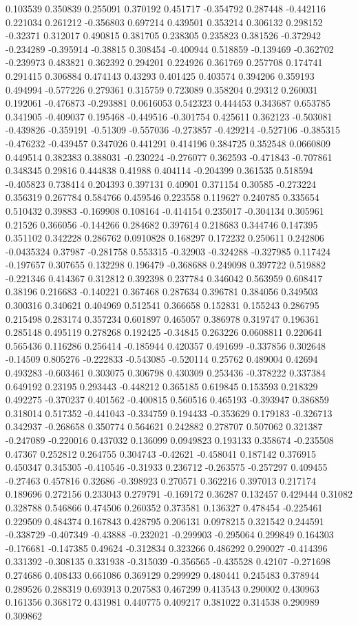 0.103539 0.350839 0.255091 0.370192 0.451717 -0.354792 0.287448 -0.442116 0.221034 0.261212 -0.356803 0.697214 0.439501 0.353214 0.306132 0.298152 -0.32371 0.312017 0.490815 0.381705 0.238305 0.235823 0.381526 -0.372942 -0.234289 -0.395914 -0.38815 0.308454 -0.400944 0.518859 -0.139469 -0.362702 -0.239973 0.483821 0.362392 0.294201 0.224926 0.361769 0.257708 0.174741 0.291415 0.306884 0.474143 0.43293 0.401425 0.403574 0.394206 0.359193 0.494994 -0.577226 0.279361 0.315759 0.723089 0.358204 0.29312 0.260031 0.192061 -0.476873 -0.293881 0.0616053 0.542323 0.444453 0.343687 0.653785 0.341905 -0.409037 0.195468 -0.449516 -0.301754 0.425611 0.362123 -0.503081 -0.439826 -0.359191 -0.51309 -0.557036 -0.273857 -0.429214 -0.527106 -0.385315 -0.476232 -0.439457 0.347026 0.441291 0.414196 0.384725 0.352548 0.0660809 0.449514 0.382383 0.388031 -0.230224 -0.276077 0.362593 -0.471843 -0.707861 0.348345 0.29816 0.444838 0.41988 0.404114 -0.204399 0.361535 0.518594 -0.405823 0.738414 0.204393 0.397131 0.40901 0.371154 0.30585 -0.273224 0.356319 0.267784 0.584766 0.459546 0.223558 0.119627 0.240785 0.335654 0.510432 0.39883 -0.169908 0.108164 -0.414154 0.235017 -0.304134 0.305961 0.21526 0.366056 -0.144266 0.284682 0.397614 0.218683 0.344746 0.147395 0.351102 0.342228 0.286762 0.0910828 0.168297 0.172232 0.250611 0.242806 -0.0435324 0.37987 -0.281758 0.553315 -0.32903 -0.324288 -0.327985 0.117424 -0.197657 0.307655 0.132298 0.196479 -0.368688 0.249098 0.397722 0.519882 -0.221346 0.414367 0.312812 0.392398 0.237784 0.346042 0.563959 0.608417 0.38196 0.216683 -0.140221 0.367468 0.287634 0.396781 0.384056 0.349503 0.300316 0.340621 0.404969 0.512541 0.366658 0.152831 0.155243 0.286795 0.215498 0.283174 0.357234 0.601897 0.465057 0.386978 0.319747 0.196361 0.285148 0.495119 0.278268 0.192425 -0.34845 0.263226 0.0608811 0.220641 0.565436 0.116286 0.256414 -0.185944 0.420357 0.491699 -0.337856 0.302648 -0.14509 0.805276 -0.222833 -0.543085 -0.520114 0.25762 0.489004 0.42694 0.493283 -0.603461 0.303075 0.306798 0.430309 0.253436 -0.378222 0.337384 0.649192 0.23195 0.293443 -0.448212 0.365185 0.619845 0.153593 0.218329 0.492275 -0.370237 0.401562 -0.400815 0.560516 0.465193 -0.393947 0.386859 0.318014 0.517352 -0.441043 -0.334759 0.194433 -0.353629 0.179183 -0.326713 0.342937 -0.268658 0.350774 0.564621 0.242882 0.278707 0.507062 0.321387 -0.247089 -0.220016 0.437032 0.136099 0.0949823 0.193133 0.358674 -0.235508 0.47367 0.252812 0.264755 0.304743 -0.42621 -0.458041 0.187142 0.376915 0.450347 0.345305 -0.410546 -0.31933 0.236712 -0.263575 -0.257297 0.409455 -0.27463 0.457816 0.32686 -0.398923 0.270571 0.362216 0.397013 0.217174 0.189696 0.272156 0.233043 0.279791 -0.169172 0.36287 0.132457 0.429444 0.31082 0.328788 0.546866 0.474506 0.260352 0.373581 0.136327 0.478454 -0.225461 0.229509 0.484374 0.167843 0.428795 0.206131 0.0978215 0.321542 0.244591 -0.338729 -0.407349 -0.43888 -0.232021 -0.299903 -0.295064 0.299849 0.164303 -0.176681 -0.147385 0.49624 -0.312834 0.323266 0.486292 0.290027 -0.414396 0.331392 -0.308135 0.331938 -0.315039 -0.356565 -0.435528 0.42107 -0.271698 0.274686 0.408433 0.661086 0.369129 0.299929 0.480441 0.245483 0.378944 0.289526 0.288319 0.693913 0.207583 0.467299 0.413543 0.290002 0.430963 0.161356 0.368172 0.431981 0.440775 0.409217 0.381022 0.314538 0.290989 0.309862 